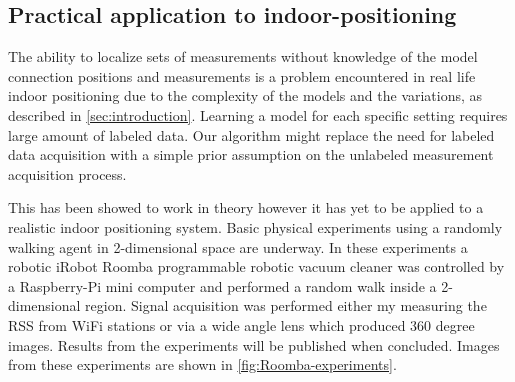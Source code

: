 	\subsection{Practical application to indoor-positioning}
		\label{subsec:Practical-application-to}
	
	The ability to localize sets of measurements without knowledge of
	the model connection positions and measurements is a problem encountered
	in real life indoor positioning due to the complexity of the models
	and the variations, as described in \cref{sec:introduction}.
	Learning a model for each specific setting requires large amount of
	labeled data. Our algorithm might replace the need for labeled data
	acquisition with a simple prior assumption on the unlabeled measurement
	acquisition process. 
	
	This has been showed to work in theory however it has yet to be applied
	to a realistic indoor positioning system. Basic physical experiments
	using a randomly walking agent in 2-dimensional space are underway.
	In these experiments a robotic iRobot Roomba programmable robotic
	vacuum cleaner was controlled by a Raspberry-Pi mini computer and
	performed a random walk inside a 2-dimensional region. Signal acquisition
	was performed either my measuring the \ac{RSS} from WiFi stations
	or via a wide angle lens which produced 360 degree images. Results
	from the experiments will be published when concluded. Images from
	these experiments are shown in \cref{fig:Roomba-experiments}.
	
	\iffalse
	\begin{figure}[h]
		\begin{centering}
			\begin{minipage}[t]{0.45\columnwidth}%
				\begin{flushleft}
					\subfloat[\ac{RSS} measurement]{\begin{centering}
							\texttt{[image: figures/Chapter\_6/Roomba\_wifi]}
							\par\end{centering}
					}
					\par\end{flushleft}%
			\end{minipage}\hfill{}%
			\begin{minipage}[t]{0.45\columnwidth}%
				\subfloat[Panoramic camera]{\begin{centering}
						\texttt{[image: figures/Chapter\_6/Roomba\_pano]}
						\par\end{centering}
				}%
			\end{minipage}
			\par\end{centering}
		\caption{Roomba experiments \label{fig:Roomba-experiments}}
	\end{figure}
	\fi
	
